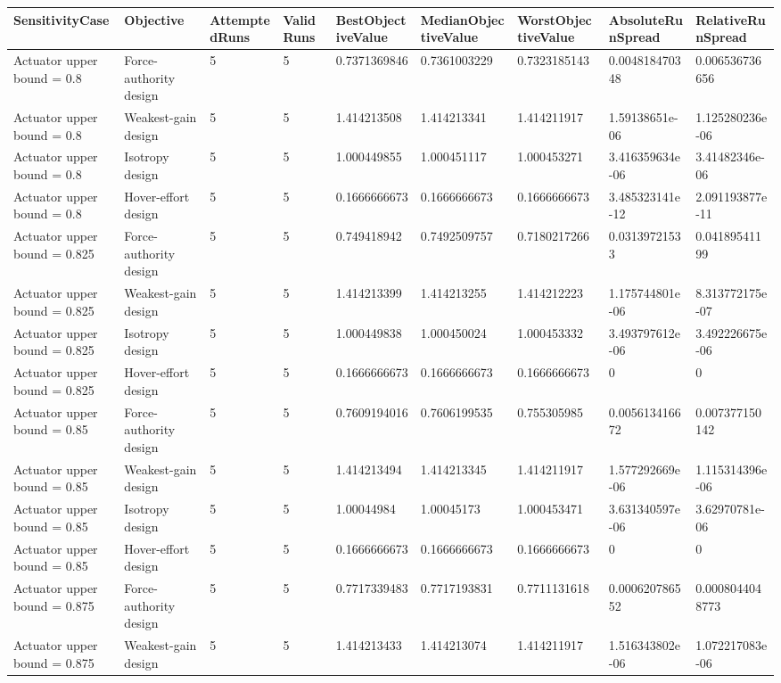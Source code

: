 \begin{tabular}{@{}lllllllll@{}}
\toprule
SensitivityCase & Objective & AttemptedRuns & ValidRuns & BestObjectiveValue & MedianObjectiveValue & WorstObjectiveValue & AbsoluteRunSpread & RelativeRunSpread \\
\midrule
Actuator upper bound = 0.8 & Force-authority design & 5 & 5 & 0.7371369846 & 0.7361003229 & 0.7323185143 & 0.004818470348 & 0.006536736656 \\
Actuator upper bound = 0.8 & Weakest-gain design & 5 & 5 & 1.414213508 & 1.414213341 & 1.414211917 & 1.59138651e-06 & 1.125280236e-06 \\
Actuator upper bound = 0.8 & Isotropy design & 5 & 5 & 1.000449855 & 1.000451117 & 1.000453271 & 3.416359634e-06 & 3.41482346e-06 \\
Actuator upper bound = 0.8 & Hover-effort design & 5 & 5 & 0.1666666673 & 0.1666666673 & 0.1666666673 & 3.485323141e-12 & 2.091193877e-11 \\
Actuator upper bound = 0.825 & Force-authority design & 5 & 5 & 0.749418942 & 0.7492509757 & 0.7180217266 & 0.03139721533 & 0.04189541199 \\
Actuator upper bound = 0.825 & Weakest-gain design & 5 & 5 & 1.414213399 & 1.414213255 & 1.414212223 & 1.175744801e-06 & 8.313772175e-07 \\
Actuator upper bound = 0.825 & Isotropy design & 5 & 5 & 1.000449838 & 1.000450024 & 1.000453332 & 3.493797612e-06 & 3.492226675e-06 \\
Actuator upper bound = 0.825 & Hover-effort design & 5 & 5 & 0.1666666673 & 0.1666666673 & 0.1666666673 & 0 & 0 \\
Actuator upper bound = 0.85 & Force-authority design & 5 & 5 & 0.7609194016 & 0.7606199535 & 0.755305985 & 0.005613416672 & 0.007377150142 \\
Actuator upper bound = 0.85 & Weakest-gain design & 5 & 5 & 1.414213494 & 1.414213345 & 1.414211917 & 1.577292669e-06 & 1.115314396e-06 \\
Actuator upper bound = 0.85 & Isotropy design & 5 & 5 & 1.00044984 & 1.00045173 & 1.000453471 & 3.631340597e-06 & 3.62970781e-06 \\
Actuator upper bound = 0.85 & Hover-effort design & 5 & 5 & 0.1666666673 & 0.1666666673 & 0.1666666673 & 0 & 0 \\
Actuator upper bound = 0.875 & Force-authority design & 5 & 5 & 0.7717339483 & 0.7717193831 & 0.7711131618 & 0.000620786552 & 0.0008044048773 \\
Actuator upper bound = 0.875 & Weakest-gain design & 5 & 5 & 1.414213433 & 1.414213074 & 1.414211917 & 1.516343802e-06 & 1.072217083e-06 \\

\end{tabular}
